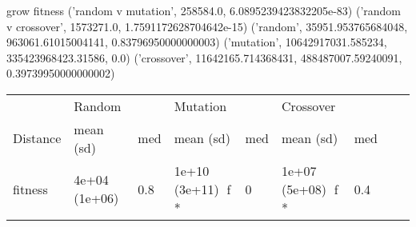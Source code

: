 grow
fitness
('random v mutation', 258584.0, 6.0895239423832205e-83)
('random v crossover', 1573271.0, 1.7591172628704642e-15)
('random', 35951.953765684048, 963061.61015004141, 0.83796950000000003)
('mutation', 10642917031.585234, 335423968423.31586, 0.0)
('crossover', 11642165.714368431, 488487007.59240091, 0.39739950000000002)
\begin{tabular}{l|ll|lll|lll}
         & Random      &      & Mutation       &       & Crossover       &       \\
Distance & mean (sd)   & med  & mean (sd)      & med   & mean (sd)       & med   \\ \hline
 fitness      & 4e+04 (1e+06) & 0.8 & 1e+10 (3e+11) {f *} & 0  & 1e+07 (5e+08) {f *}  & 0.4  \\
\end{tabular}
